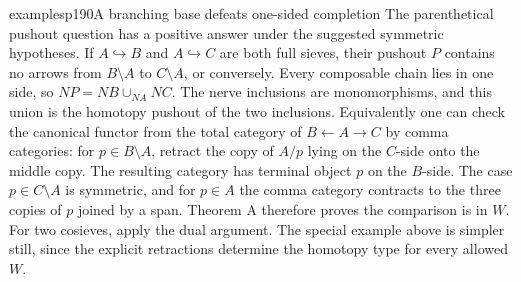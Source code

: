 \begin{dcomment}{examples}{p190}{A branching base defeats one-sided completion}
The parenthetical pushout question has a positive answer under the suggested symmetric hypotheses. If $A\hookrightarrow B$ and $A\hookrightarrow C$ are both full sieves, their pushout $P$ contains no arrows from $B\setminus A$ to $C\setminus A$, or conversely. Every composable chain lies in one side, so $NP=NB\cup_{NA}NC$. The nerve inclusions are monomorphisms, and this union is the homotopy pushout of the two inclusions. Equivalently one can check the canonical functor from the total category of $B\leftarrow A\to C$ by comma categories: for $p\in B\setminus A$, retract the copy of $A/p$ lying on the $C$-side onto the middle copy. The resulting category has terminal object $p$ on the $B$-side. The case $p\in C\setminus A$ is symmetric, and for $p\in A$ the comma category contracts to the three copies of $p$ joined by a span. Theorem A therefore proves the comparison is in $W$. For two cosieves, apply the dual argument. The special example above is simpler still, since the explicit retractions determine the homotopy type for every allowed $W$.
\end{dcomment}

